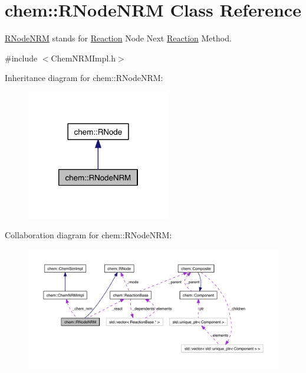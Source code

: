 \hypertarget{classchem_1_1RNodeNRM}{\section{chem\-:\-:R\-Node\-N\-R\-M Class Reference}
\label{classchem_1_1RNodeNRM}
}


\hyperlink{classchem_1_1RNodeNRM}{R\-Node\-N\-R\-M} stands for \hyperlink{classchem_1_1Reaction}{Reaction} Node Next \hyperlink{classchem_1_1Reaction}{Reaction} Method.  




{\ttfamily \#include $<$Chem\-N\-R\-M\-Impl.\-h$>$}



Inheritance diagram for chem\-:\-:R\-Node\-N\-R\-M\-:\nopagebreak
\begin{figure}[H]
\begin{center}
\leavevmode
\includegraphics[width=178pt]{classchem_1_1RNodeNRM__inherit__graph}
\end{center}
\end{figure}


Collaboration diagram for chem\-:\-:R\-Node\-N\-R\-M\-:\nopagebreak
\begin{figure}[H]
\begin{center}
\leavevmode
\includegraphics[width=350pt]{classchem_1_1RNodeNRM__coll__graph}
\end{center}
\end{figure}
